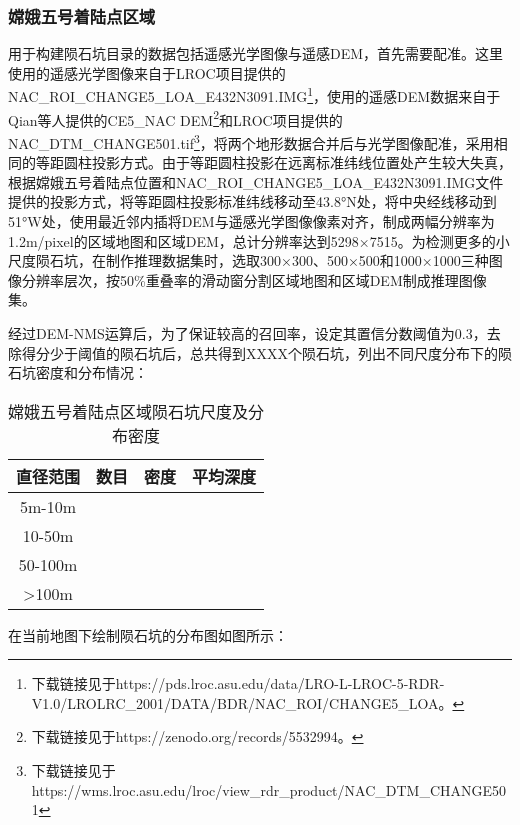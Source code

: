 \subsubsection{嫦娥五号着陆点区域}
\label{sec:chang_e_5 crater}
用于构建陨石坑目录的数据包括遥感光学图像与遥感DEM，首先需要配准。这里使用的遥感光学图像来自于LROC\cite{robinsonLunarReconnaissanceOrbiter2010}项目提供的NAC\_ROI\_CHANGE5\_LOA\_E432N3091.IMG\footnote{ 下载链接见于https://pds.lroc.asu.edu/data/LRO-L-LROC-5-RDR-V1.0/LROLRC\_2001/DATA/BDR/NAC\_ROI/CHANGE5\_LOA。}，使用的遥感DEM数据来自于Qian\cite{qianCopernicanaged200Ma2021}等人提供的CE5\_NAC DEM\footnote{下载链接见于https://zenodo.org/records/5532994。}和LROC项目提供的NAC\_DTM\_CHANGE501.tif\footnote{ 下载链接见于https://wms.lroc.asu.edu/lroc/view\_rdr\_product/NAC\_DTM\_CHANGE501}，将两个地形数据合并后与光学图像配准，采用相同的等距圆柱投影方式。由于等距圆柱投影在远离标准纬线位置处产生较大失真，根据嫦娥五号着陆点位置和NAC\_ROI\_CHANGE5\_LOA\_E432N3091.IMG文件提供的投影方式，将等距圆柱投影标准纬线移动至43.8°N处，将中央经线移动到51°W处，使用最近邻内插将DEM与遥感光学图像像素对齐，制成两幅分辨率为1.2m/pixel的区域地图和区域DEM，总计分辨率达到5298×7515。为检测更多的小尺度陨石坑，在制作推理数据集时，选取300×300、500×500和1000×1000三种图像分辨率层次，按50\%重叠率的滑动窗分割区域地图和区域DEM制成推理图像集。\par
经过DEM-NMS运算后，为了保证较高的召回率，设定其置信分数阈值为0.3，去除得分少于阈值的陨石坑后，总共得到XXXX个陨石坑，列出不同尺度分布下的陨石坑密度和分布情况：
\begin{table}[H]
  \begin{center}
  \caption{嫦娥五号着陆点区域陨石坑尺度及分布密度}
  \label{tab:chang_e_5 crater}
  \begin{tabular}{ c  c  c  c}
  \toprule
  直径范围 & 数目 & 密度 & 平均深度 \\
  \hline
  5m-10m &  &  & \\
  10-50m &  &  & \\
  50-100m &  &  & \\
  >100m &  &  & \\
  \bottomrule 
  \end{tabular}
  \end{center}
\end{table}\par
在当前地图下绘制陨石坑的分布图如图所示：


